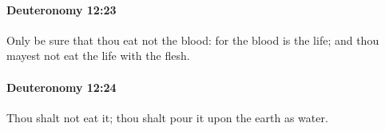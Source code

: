 		\paragraph{Deuteronomy 12:23} %
			\label{DEUTERONOMY-12-23}

			Only be sure that thou eat not the blood: for the blood is the life; and thou mayest not eat the life with the flesh.


		\paragraph{Deuteronomy 12:24} %
			\label{DEUTERONOMY-12-24}

			Thou shalt not eat it; thou shalt pour it upon the earth as water.


